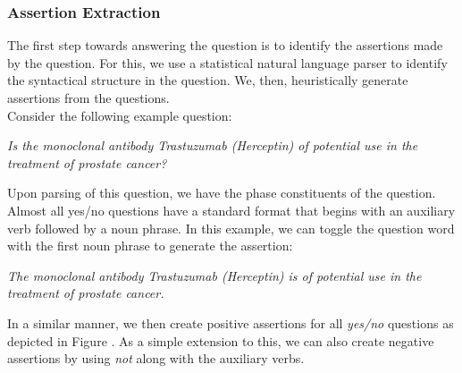 
\subsubsection{Assertion Extraction}

The first step towards answering the question is to identify the assertions made by the question. For this, we use a statistical natural language parser to identify the syntactical structure in the question. We, then, heuristically generate assertions from the questions.\\
Consider the following example question:

\textit{Is the monoclonal antibody Trastuzumab (Herceptin) of potential use in the treatment of prostate cancer?}

Upon parsing of this question, we have the phase constituents of the question. Almost all yes/no questions have a standard format that begins with an auxiliary verb followed by a noun phrase. In this example, we can toggle the question word with the first noun phrase to generate the assertion:

\textit{The monoclonal antibody Trastuzumab (Herceptin) is of potential use in the treatment of prostate cancer.}

In a similar manner, we then create positive assertions for all \textit{yes/no} questions as depicted in Figure . As a simple extension to this, we can also create negative assertions by using \textit{not} along with the auxiliary verbs.

